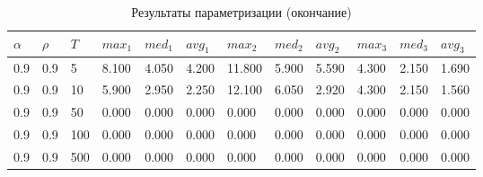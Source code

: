 \documentclass{bmstu}
\begin{document}
	\begin{longtable}{|p{}|p{}|p{}|p{}|p{}|p{}|p{}|p{}|p{}|p{}|p{}|p{}|}
	\caption{\label{tab:params4}Результаты параметризации (окончание)} \\
	\hline
	$\alpha$ & $\rho$ & $T$ & $max_1$ & $med_1$ & $avg_1$  & $max_2$ & $med_2$ & $avg_2$  & $max_3$ & $med_3$ & $avg_3$ \\
	\hline
		0.9 & 0.9 & 5 & 8.100 & 4.050 & 4.200 & 11.800 & 5.900 & 5.590 & 4.300 & 2.150 & 1.690 \\
		\hline
		0.9 & 0.9 & 10 & 5.900 & 2.950 & 2.250 & 12.100 & 6.050 & 2.920 & 4.300 & 2.150 & 1.560 \\
		\hline
		0.9 & 0.9 & 50 & 0.000 & 0.000 & 0.000 & 0.000 & 0.000 & 0.000 & 0.000 & 0.000 & 0.000 \\
		\hline
		0.9 & 0.9 & 100 & 0.000 & 0.000 & 0.000 & 0.000 & 0.000 & 0.000 & 0.000 & 0.000 & 0.000 \\
		\hline
		0.9 & 0.9 & 500 & 0.000 & 0.000 & 0.000 & 0.000 & 0.000 & 0.000 & 0.000 & 0.000 & 0.000 \\
		\hline
	\end{longtable}
	
\end{document}
